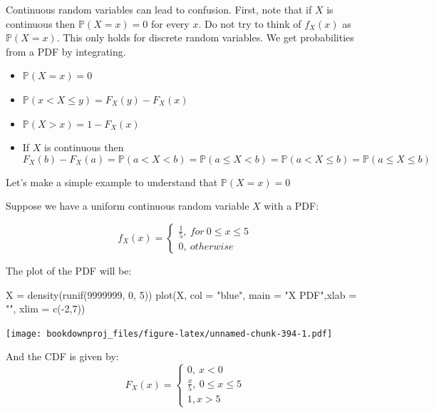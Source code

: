 \documentclass[
]{book}
\newenvironment{Shaded}{\begin{snugshade}}{\end{snugshade}}
\newcommand{\AttributeTok}[1]{\textcolor[rgb]{0.77,0.63,0.00}{#1}}
\newcommand{\DecValTok}[1]{\textcolor[rgb]{0.00,0.00,0.81}{#1}}
\newcommand{\FunctionTok}[1]{\textcolor[rgb]{0.00,0.00,0.00}{#1}}
\newcommand{\NormalTok}[1]{#1}
\newcommand{\OtherTok}[1]{\textcolor[rgb]{0.56,0.35,0.01}{#1}}
\newcommand{\SpecialCharTok}[1]{\textcolor[rgb]{0.00,0.00,0.00}{#1}}
\newcommand{\StringTok}[1]{\textcolor[rgb]{0.31,0.60,0.02}{#1}}
\providecommand{\tightlist}{%
  \setlength{\itemsep}{0pt}\setlength{\parskip}{0pt}}
\theoremstyle{definition}
\theoremstyle{definition}
\theoremstyle{definition}
\theoremstyle{definition}
\theoremstyle{remark}
\begin{document}
Continuous random variables can lead to confusion. First, note that if \(X\) is continuous then \(\mathbb{P}(X=x)=0\) for every \(x\). Do not try to think of \(f_X(x)\) as \(\mathbb{P}(X=x)\). This only holds for discrete random variables. We get probabilities from a PDF by integrating.

\begin{itemize}
\tightlist
\item
  \(\mathbb{P}(X=x)=0\)
\item
  \(\mathbb{P}(x< X \leq y)= F_X(y)-F_X(x)\)
\item
  \(\mathbb{P}(X>x)=1-F_X(x)\)
\item
  If \(X\) is continuous then
  \[
  F_X(b)-F_X(a)= \mathbb{P}(a<X<b)=\mathbb{P}(a\leq X<b)=\mathbb{P}(a<X\leq b)=\mathbb{P}(a\leq X \leq b)
  \]
\end{itemize}

Let's make a simple example to understand that \(\mathbb{P}(X=x)=0\)

Suppose we have a uniform continuous random variable \(X\) with a PDF:

\[
f_{X}(x)=\begin{cases}
\frac{1}{5},\ for\ 0 \leq x \leq 5\\
0,\ otherwise
\end{cases}
\]

The plot of the PDF will be:

\begin{Shaded}
\begin{Highlighting}[]
\NormalTok{X }\OtherTok{=} \FunctionTok{density}\NormalTok{(}\FunctionTok{runif}\NormalTok{(}\DecValTok{9999999}\NormalTok{, }\DecValTok{0}\NormalTok{, }\DecValTok{5}\NormalTok{))}
\FunctionTok{plot}\NormalTok{(X, }\AttributeTok{col =} \StringTok{"blue"}\NormalTok{, }\AttributeTok{main =} \StringTok{"X PDF"}\NormalTok{,}\AttributeTok{xlab =} \StringTok{""}\NormalTok{, }\AttributeTok{xlim =} \FunctionTok{c}\NormalTok{(}\SpecialCharTok{{-}}\DecValTok{2}\NormalTok{,}\DecValTok{7}\NormalTok{))}
\end{Highlighting}
\end{Shaded}

\texttt{[image: bookdownproj\_files/figure-latex/unnamed-chunk-394-1.pdf]}

And the CDF is given by:
\[
F_{X}(x)=\begin{cases}
0,\ x < 0 \\
\frac{x}{5},\ 0 \leq x \leq 5  \\
1, x > 5
\end{cases}
\]
\end{document}
